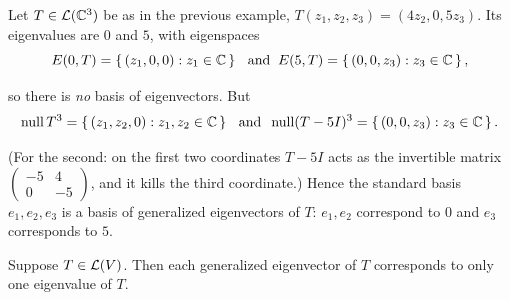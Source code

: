 \begin{example}
  Let $T \in \mathcal{L}(\mathbb{C}^3)$ be as in the previous example, $T(z_1, z_2, z_3) = (4z_2, 0, 5z_3)$. Its eigenvalues are $0$ and $5$, with eigenspaces
  \begin{equation}
    E(0, T) = \left\{ \, (z_1, 0, 0) : z_1 \in \mathbb{C} \,\right\} \;\;\, \text{and}\;\; E(5, T) = \left\{ \, (0, 0, z_3) : z_3 \in \mathbb{C} \,\right\},
  \end{equation}

  so there is \emph{no} basis of eigenvectors. But
  \begin{equation}
    \operatorname{null} T^3 = \left\{ \, (z_1, z_2, 0) : z_1, z_2 \in \mathbb{C} \,\right\} \;\;\, \text{and}\;\; \operatorname{null} (T - 5I)^3 = \left\{ \, (0, 0, z_3) : z_3 \in \mathbb{C} \,\right\}.
  \end{equation}

  (For the second: on the first two coordinates $T - 5I$ acts as the invertible matrix $\left(\begin{smallmatrix} -5 & 4 \\ 0 & -5 \end{smallmatrix}\right)$, and it kills the third coordinate.) Hence the standard basis $e_1, e_2, e_3$ is a basis of generalized eigenvectors of $T$: $e_1, e_2$ correspond to $0$ and $e_3$ corresponds to $5$.
\end{example}

\begin{thm}
  \label{thm: generalized eigenvector corresponds to a unique eigenvalue}
  Suppose $T \in \mathcal{L}(V)$. Then each generalized eigenvector of $T$ corresponds to only one eigenvalue of $T$.
\end{thm}

